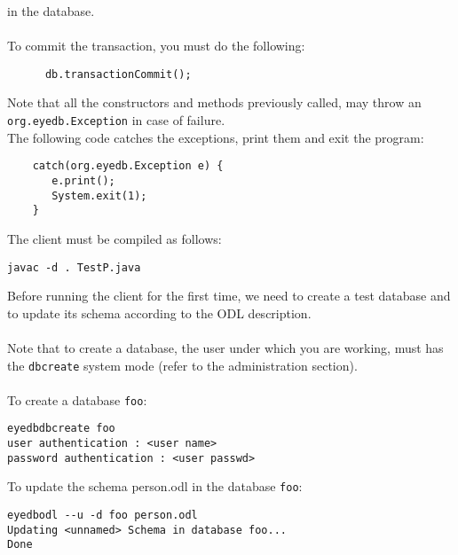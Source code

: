 in the database.
\\
\\
To commit the transaction, you must do the following:
{\verbsize \begin{verbatim}
      db.transactionCommit();
\end{verbatim}
}
Note that all the constructors and methods previously called, may
throw an \texttt{org.eyedb.Exception} in case of failure.
\\
The following code catches the exceptions, print them and exit the program:
{\verbsize \begin{verbatim}
    catch(org.eyedb.Exception e) {
       e.print();
       System.exit(1);
    }
\end{verbatim}
}

The client must be compiled as follows:
{\verbsize \begin{verbatim}
javac -d . TestP.java
\end{verbatim}
}
Before running the client for the first time, we need to create a test database
and to update its schema according to the ODL description.
\\
\\
Note that to create a database, the \eyedb user under which you are working,
must has the \texttt{dbcreate} system mode (refer to the administration
section).
\\
\\
To create a database \texttt{foo}:
\verbsize \begin{verbatim}
eyedbdbcreate foo
user authentication : <user name>
password authentication : <user passwd>
\end{verbatim}
\normalsize
To update the schema person.odl in the database \texttt{foo}:
{\verbsize \begin{verbatim}
eyedbodl --u -d foo person.odl
Updating <unnamed> Schema in database foo...
Done
\end{verbatim}
}

